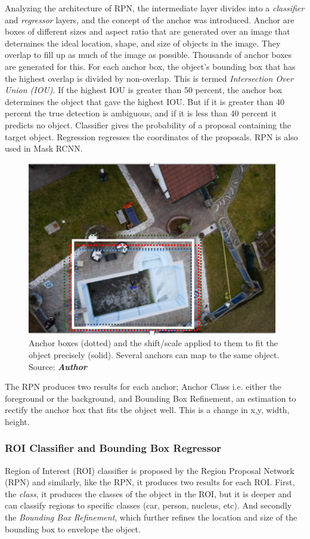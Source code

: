 {Analyzing the architecture of RPN, the intermediate layer divides into a \textit{classifier} and \textit{regressor} layers, and the 
concept of the anchor was introduced. Anchor are boxes of different sizes and aspect ratio that are generated over an 
image that determines the ideal location, shape, and size of objects in the image. They overlap to fill up as much of 
the image as possible. Thousands of anchor boxes are generated for this. For each anchor box, the object’s bounding box 
that has the highest overlap is divided by non-overlap. This is termed \textit{Intersection Over Union (IOU)}. If the highest IOU 
is greater than 50 percent, the anchor box determines the object that gave the highest IOU. But if it is greater than 40 
percent the true detection is ambiguous, and if it is less than 40 percent it predicts no object. Classifier gives the
 probability of a proposal containing the target object. Regression regresses the coordinates of the proposals. RPN is 
 also used in Mask RCNN.
\begin{figure}[H]
  \centering
  \includegraphics[height=3in]{images/rpn1.png}
  
  \caption{Anchor boxes (dotted) and the shift/scale applied to them to fit the object precisely (solid).
  Several anchors can map to the same object. Source: \textbf{\textit{Author}}}
  
\end{figure}

The RPN produces two results for each anchor; Anchor Class i.e. either the foreground or the background, and
 Bounding Box Refinement, an estimation to rectify the anchor box that fits the object well. This is a change in x,y,
  width, height.

\subsubsection{ROI Classifier and Bounding Box Regressor}
Region of Interest (ROI) classifier is proposed by the Region Proposal Network (RPN) and similarly,
 like the RPN, it produces two results for each ROI. First, the \textit{class}, it produces the classes
  of the object in the ROI, but it is deeper and can classify regions to specific classes (car, person, nucleus, etc). 
  And secondly the\textit{ Bounding Box Refinement}, which further refines the location and size of the bounding box to envelope the object.

}

